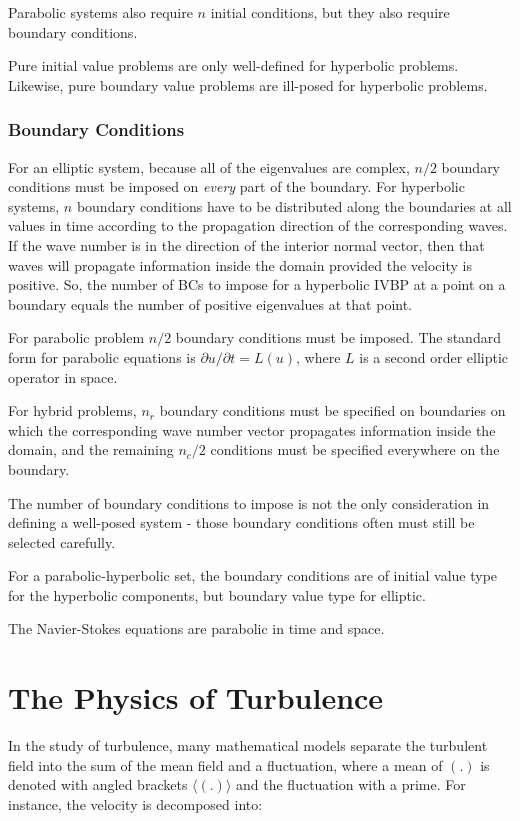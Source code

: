 \documentclass[10pt]{article}
\newcommand{\la}{\langle}
\newcommand{\ra}{\rangle}
\begin{document}
\begin{flushleft}
Parabolic systems also require \(n\) initial conditions, but they also require boundary conditions.

Pure initial value problems are only well-defined for hyperbolic problems. Likewise, pure boundary value problems are ill-posed for hyperbolic problems.


\subsubsection{Boundary Conditions}
For an elliptic system, because all of the eigenvalues are complex, \(n/2\) boundary conditions must be imposed on {\it every} part of the boundary. For hyperbolic systems, \(n\) boundary conditions have to be distributed along the boundaries at all values in time according to the propagation direction of the corresponding waves. If the wave number is in the direction of the interior normal vector, then that waves will propagate information inside the domain provided the velocity is positive. So, the number of BCs to impose for a hyperbolic IVBP at a point on a boundary equals the number of positive eigenvalues at that point.

For parabolic problem \(n/2\) boundary conditions must be imposed. The standard form for parabolic equations is \(\partial u/\partial t=L(u)\), where \(L\) is a second order elliptic operator in space.

For hybrid problems, \(n_r\) boundary conditions must be specified on boundaries on which the corresponding wave number vector propagates information inside the domain, and the remaining \(n_c/2\) conditions must be specified everywhere on the boundary.

The number of boundary conditions to impose is not the only consideration in defining a well-posed system - those boundary conditions often must still be selected carefully.

For a parabolic-hyperbolic set, the boundary conditions are of initial value type for the hyperbolic components, but boundary value type for elliptic.

The Navier-Stokes equations are parabolic in time and space.

\section{The Physics of Turbulence}

In the study of turbulence, many mathematical models separate the turbulent field into the sum of the mean field and a fluctuation, where a mean of \((.)\) is denoted with angled brackets \(\la(.)\ra\) and the fluctuation with a prime. For instance, the velocity is decomposed into:


\end{flushleft}
\end{document}
